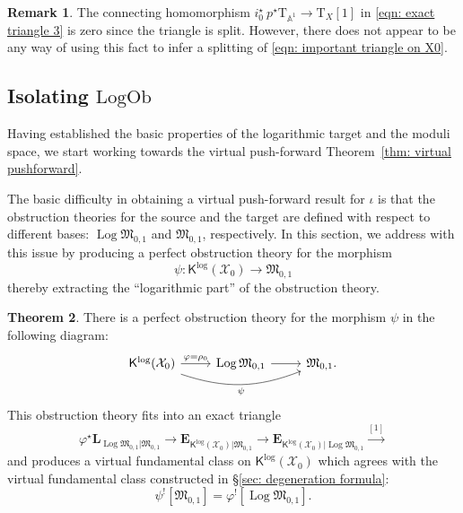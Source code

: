 \documentclass[11pt]{amsart}
\theoremstyle{definition}
\theoremstyle{definition}
\newtheorem{theorem}{Theorem}[section]
\newtheorem{remark}[theorem]{Remark}
\newcommand{\EE}{\mathbf{E}}
\newcommand{\LL}{\mathbf{L}}
\newcommand{\Aaff}{\mathbb{A}}
\newcommand{\T}{\mathrm{T}}
\newcommand{\LogOb}{\mathrm{LogOb}}
\newcommand{\Xcal}{\mathcal{X}}
\newcommand{\Mfrak}{\mathfrak{M}}
\newcommand{\Kup}{\mathsf{K}}
\newcommand{\Log}{\operatorname{Log}}
\begin{document}
\begin{remark} The connecting homomorphism $i_0^\star \ p^\star \T_{\Aaff^{\! 1}} \to \T_X[1]$ in \eqref{eqn: exact triangle 3} is zero since the triangle is split. However, there does not appear to be any way of using this fact to infer a splitting of \eqref{eqn: important triangle on X0}.\end{remark}

\subsection{Isolating $\LogOb$}\label{sec: isolating LogOb} Having established the basic properties of the logarithmic target and the moduli space, we start working towards the virtual push-forward Theorem~\ref{thm: virtual pushforward}.

The basic difficulty in obtaining a virtual push-forward result for $\iota$ is that the obstruction theories for the source and the target are defined with respect to different bases: $\Log\Mfrak_{0,1}$ and $\Mfrak_{0,1}$, respectively. In this section, we address with this issue by producing a perfect obstruction theory for the morphism
\begin{equation*} \psi \colon \Kup^{\log}(\Xcal_0) \to \Mfrak_{0,1} \end{equation*}
thereby extracting the ``logarithmic part'' of the obstruction theory. 

\begin{theorem}\label{thm: isolating LogOb} There is a perfect obstruction theory for the morphism $\psi$ in the following diagram:
\begin{equation}\label{eqn: diagram Klog LogM M}
\begin{tikzcd}
\Kup^{\log}(\Xcal_0) \ar[r,"\varphi=\rho_0"] \ar[rr,bend right=20pt,"\psi" below] & \Log\Mfrak_{0,1} \ar[r] & \Mfrak_{0,1}.
\end{tikzcd}
\end{equation}
This obstruction theory fits into an exact triangle
\[ \varphi^\star \LL_{\Log \Mfrak_{0,1}|\Mfrak_{0,1}} \to \EE_{\Kup^{\log}(\Xcal_0)|\Mfrak_{0,1}} \to \EE_{\Kup^{\log}(\Xcal_0)|\Log\Mfrak_{0,1}} \xrightarrow{{[1]}} \]
and produces a virtual fundamental class on $\Kup^{\log}(\Xcal_0)$ which agrees with the virtual fundamental class constructed in \S \ref{sec: degeneration formula}:
\[ \psi^! [ \Mfrak_{0,1}] = \varphi^! [\Log \Mfrak_{0,1}].\]
\end{theorem}
\end{document}
